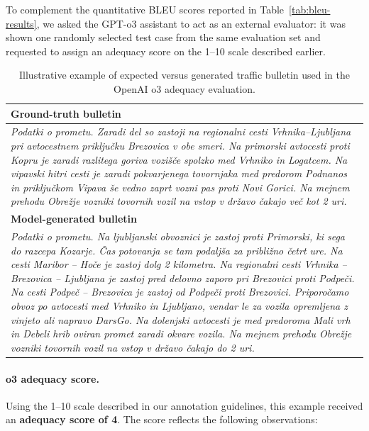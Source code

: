 \documentclass[fleqn,moreauthors,10pt]{ds_report}
\begin{document}
To complement the quantitative BLEU scores reported in Table~\ref{tab:bleu-results}, we asked the GPT\mbox{-}o3 assistant to act as an external evaluator: it was shown one randomly selected test case from the same evaluation set and requested to assign an adequacy score on the 1–10 scale described earlier.


\begin{table}[ht]
\centering
\footnotesize                    %
\renewcommand{\arraystretch}{1.15}
\setlength{\tabcolsep}{4pt}
\begin{tabularx}{\linewidth}{@{}X@{}}
\toprule
\textbf{Ground-truth bulletin} \\  %
\midrule
\textit{Podatki o prometu. Zaradi del so zastoji na regionalni cesti Vrhnika–Ljubljana pri avtocestnem priključku Brezovica v obe smeri. Na primorski avtocesti proti Kopru je zaradi razlitega goriva vozišče spolzko med Vrhniko in Logatcem. Na vipavski hitri cesti je zaradi pokvarjenega tovornjaka med predorom Podnanos in priključkom Vipava še vedno zaprt vozni pas proti Novi Gorici. Na mejnem prehodu Obrežje vozniki tovornih vozil na vstop v državo čakajo več kot 2 uri.} \\[0.8em] %
\midrule

\textbf{Model-generated bulletin} \\  %
\midrule
\textit{Podatki o prometu. Na ljubljanski obvoznici je zastoj proti Primorski, ki sega do razcepa Kozarje. Čas potovanja se tam podaljša za približno četrt ure. Na cesti Maribor – Hoče je zastoj dolg 2 kilometra. Na regionalni cesti Vrhnika – Brezovica – Ljubljana je zastoj pred delovno zaporo pri Brezovici proti Podpeči. Na cesti Podpeč – Brezovica je zastoj od Podpeči proti Brezovici. Priporočamo obvoz po avtocesti med Vrhniko in Ljubljano, vendar le za vozila opremljena z vinjeto ali napravo DarsGo. Na dolenjski avtocesti je med predoroma Mali vrh in Debeli hrib oviran promet zaradi okvare vozila. Na mejnem prehodu Obrežje vozniki tovornih vozil na vstop v državo čakajo do 2 uri.} \\
\bottomrule
\end{tabularx}
\caption{Illustrative example of expected versus generated traffic bulletin used in the OpenAI o3 adequacy evaluation.}
\label{tab:qualitative}
\end{table}

\paragraph{o3 adequacy score.}  
Using the 1–10 scale described in our annotation guidelines, this example received an \textbf{adequacy score of 4}.  The score reflects the following observations:
\end{document}
